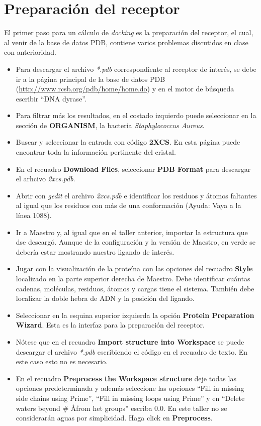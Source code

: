 \documentclass{article}
\begin{document}
\section{Preparación del receptor}
El primer paso para un cálculo de \emph{docking} es la preparación del receptor, el cual, al venir de la base de datos PDB, contiene varios problemas discutidos en clase con anterioridad.
\begin{itemize}
    \item Para descargar el archivo \emph{*.pdb} correspondiente al receptor de interés, se debe ir a la página principal de la base de datos PDB (\url{http://www.rcsb.org/pdb/home/home.do}) y en el motor de búsqueda escribir ``DNA dyrase''.
    \item Para filtrar más los resultados, en el costado izquierdo puede seleccionar en la sección de \textbf{ORGANISM}, la bacteria \emph{Staphylococcus Aureus}.
    \item Buscar y seleccionar la entrada con código \textbf{2XCS}. En esta página puede encontrar toda la información pertinente del cristal.
    \item En el recuadro \textbf{Download Files}, seleccionar \textbf{PDB Format} para descargar el arhcivo \emph{2xcs.pdb}.
    \item Abrir con \emph{gedit} el archivo \emph{2xcs.pdb} e identificar los residuos y átomos faltantes al igual que los residuos con más de una conformación (Ayuda: Vaya a la línea 1088).
    \item Ir a Maestro y, al igual que en el taller anterior, importar la estructura que dse descargó. Aunque de la configuración y la versión de Maestro, en verde se debería estar mostrando nuestro ligando de interés.
    \item Jugar con la visualización de la proteína con las opciones del recuadro \textbf{Style} localizado en la parte superior derecha de Maestro. Debe identificar cuántas cadenas, moléculas, residuos, átomos y cargas tiene el sistema. También debe localizar la doble hebra de ADN y la posición del ligando.
    \item Seleccionar en la esquina superior izquierda la opción \textbf{Protein Preparation Wizard}. Esta es la interfaz para la preparación del receptor.
    \item Nótese que en el recuadro \textbf{Import structure into Workspace} se puede descargar el archivo \emph{*.pdb} escribiendo el código en el recuadro de texto. En este caso esto no es necesario.
    \item En el recuadro \textbf{Preprocess the Workspace structure} deje todas las opciones predeterminada y además seleccione las opciones ``Fill in missing side chains using Prime'', ``Fill in missing loops using Prime'' y en ``Delete waters beyond \# \AA from het groups'' escriba 0.0. En este taller no se considerarán aguas por simplicidad. Haga click en \textbf{Preprocess}.

\end{itemize}
\end{document}
